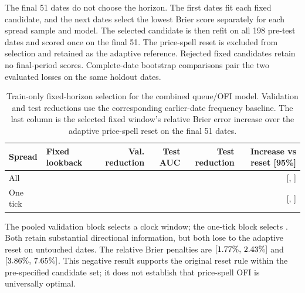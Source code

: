 \documentclass[11pt,a4paper]{article}
\begin{document}
The final 51 dates do not choose the horizon. The first
\OfiHorizonDevelopmentDates{} dates fit each fixed candidate, and the next
\OfiHorizonSelectionDates{} dates select the lowest Brier score separately for
each spread sample and model. The selected candidate is then refit on all 198
pre-test dates and scored once on the final 51. The price-spell reset is
excluded from selection and retained as the adaptive reference. Rejected fixed
candidates retain no final-period scores. Complete-date bootstrap comparisons
pair the two evaluated losses on the same holdout dates.

\begin{table}[H]
  \centering
  \caption{Train-only fixed-horizon selection for the combined queue/OFI model.
  Validation and test reductions use the corresponding earlier-date frequency
  baseline. The last column is the selected fixed window's relative Brier
  error increase over the adaptive price-spell reset on the final 51 dates.}
  \label{tab:ofihorizons}
  \small
  \begin{tabular}{llrrrr}
    \toprule
    Spread & Fixed lookback & Val. reduction & Test AUC & Test reduction &
      Increase vs reset [95\%] \\
    \midrule
    All & \OfiFixedAllWindow{} & \OfiFixedAllValidationReduction{} &
      \OfiFixedAllAuc{} & \OfiFixedAllBrierReduction{} &
      \OfiFixedAllPenalty{} [\OfiFixedAllPenaltyLower{}, \OfiFixedAllPenaltyUpper{}] \\
    One tick & \OfiFixedOneTickWindow{} &
      \OfiFixedOneTickValidationReduction{} & \OfiFixedOneTickAuc{} &
      \OfiFixedOneTickBrierReduction{} &
      \OfiFixedOneTickPenalty{} [\OfiFixedOneTickPenaltyLower{}, \OfiFixedOneTickPenaltyUpper{}] \\
    \bottomrule
  \end{tabular}
\end{table}

The pooled validation block selects a \OfiFixedAllWindow{} clock window; the
one-tick block selects \OfiFixedOneTickWindow{}. Both retain substantial
directional information, but both lose to the adaptive reset on untouched
dates. The relative Brier penalties are \OfiFixedAllPenalty{}
$[1.77\%{},\,2.43\%{}]$ and
\OfiFixedOneTickPenalty{}
$[3.86\%{},\,7.65\%{}]$. This
negative result supports the original reset rule within the pre-specified
candidate set; it does not establish that price-spell OFI is universally
optimal.
\end{document}
